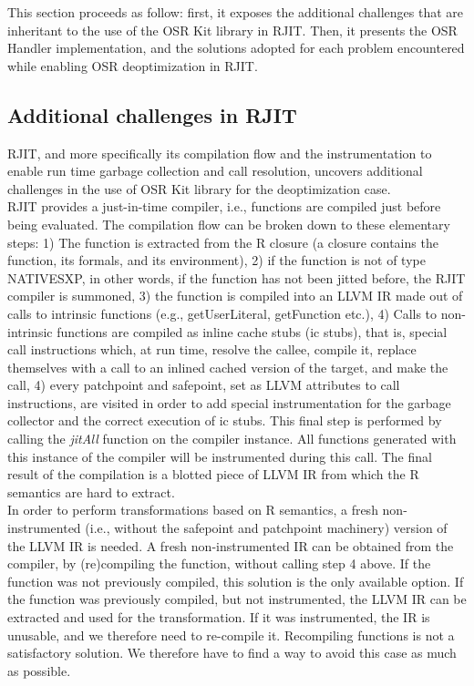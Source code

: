 This section proceeds as follow: first, it exposes the additional challenges that are inheritant to the use of the OSR Kit library in RJIT.
Then, it presents the OSR Handler implementation, and the solutions adopted for each problem encountered while enabling OSR deoptimization in RJIT.\\
 
\subsection{Additional challenges in RJIT}\label{additionalchallenges}

RJIT, and more specifically its compilation flow and the instrumentation to enable run time garbage collection and call resolution, uncovers additional challenges in the use of OSR Kit\cite{OSRKit} library for the deoptimization case.\\

RJIT provides a just-in-time compiler, i.e., functions are compiled just before being evaluated.
The compilation flow can be broken down to these elementary steps: 1) The function is extracted from the R closure (a closure contains the function, its formals, and its environment), 2) if the function is not of type NATIVESXP, in other words, if the function has not been jitted before, the RJIT compiler is summoned, 3) the function is compiled into an LLVM IR made out of calls to intrinsic functions (e.g., getUserLiteral, getFunction etc.), 4) Calls to non-intrinsic functions are compiled as inline cache stubs (ic stubs), that is, special call instructions which, at run time, resolve the callee, compile it, replace themselves with a call to an inlined cached version of the target, and make the call, 4) every patchpoint and safepoint, set as LLVM attributes\cite{llvmAttribute} to call instructions, are visited in order to add special instrumentation for the garbage collector and the correct execution of ic stubs.
This final step is performed by calling the \textit{jitAll} function on the compiler instance.
All functions generated with this instance of the compiler will be instrumented during this call.
The final result of the compilation is a blotted piece of LLVM IR from which the R semantics are hard to extract.\\

In order to perform transformations based on R semantics, a fresh non-instrumented (i.e., without the safepoint and patchpoint machinery) version of the LLVM IR is needed.
A fresh non-instrumented IR can be obtained from the compiler, by (re)compiling the function, without calling step 4 above.
If the function was not previously compiled, this solution is the only available option.
If the function was previously compiled, but not instrumented, the LLVM IR can be extracted and used for the transformation.
If it was instrumented, the IR is unusable, and we therefore need to re-compile it.
Recompiling functions is not a satisfactory solution. 
We therefore have to find a way to avoid this case as much as possible.\\

